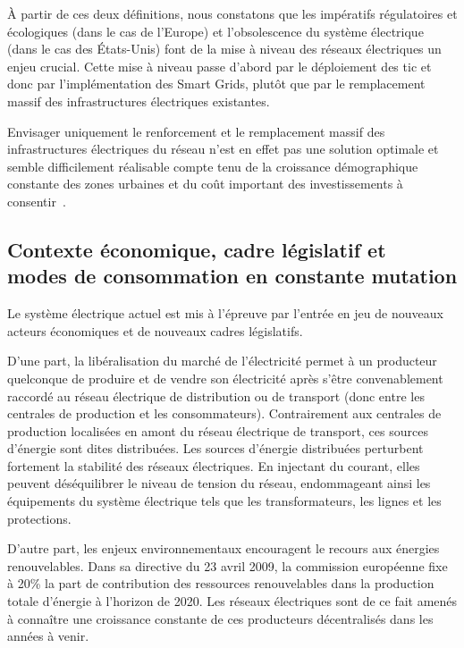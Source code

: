 À partir de ces deux définitions, nous constatons que les impératifs régulatoires et 
écologiques (dans le cas de l'Europe) et l'obsolescence du système 
électrique (dans le cas des États-Unis) font de la mise à niveau des réseaux 
électriques un enjeu crucial. Cette mise à niveau passe d'abord par le 
déploiement des \gls{tic} et donc par l'implémentation des Smart Grids, plutôt 
que par le remplacement massif des infrastructures électriques existantes. 

Envisager uniquement le renforcement et le remplacement massif des 
infrastructures électriques du  réseau 
n'est en effet pas une solution optimale et semble difficilement réalisable 
compte tenu de la croissance démographique constante des zones urbaines et du 
coût important des investissements à consentir~\cite{cre}.

\subsection{Contexte économique, cadre législatif et\\
modes de consommation en constante mutation}

Le système électrique actuel est mis à l'épreuve par l'entrée en jeu de nouveaux 
acteurs économiques et de nouveaux cadres législatifs. 

D'une part, la libéralisation du marché de l'électricité permet à un producteur 
quelconque de produire et de vendre son électricité après s'être convenablement 
raccordé au réseau électrique de distribution ou de transport (donc entre les 
centrales de production et les consommateurs). Contrairement aux centrales de 
production localisées en amont du réseau électrique de transport, ces sources 
d'énergie sont dites distribuées. Les sources d'énergie distribuées perturbent 
fortement la stabilité des réseaux électriques. En injectant du courant, elles 
peuvent déséquilibrer le niveau de tension du réseau, endommageant ainsi les 
équipements du système électrique tels que les transformateurs, les lignes et 
les protections. 

D'autre part, les enjeux environnementaux encouragent le recours aux énergies 
renouvelables. Dans sa directive du 23 avril 2009, la commission européenne fixe 
à 20\% la part de contribution des ressources renouvelables dans la production 
totale d'énergie à l'horizon de 2020. Les réseaux électriques sont de ce fait 
amenés à connaître une croissance constante de ces producteurs décentralisés 
dans les années à venir.

